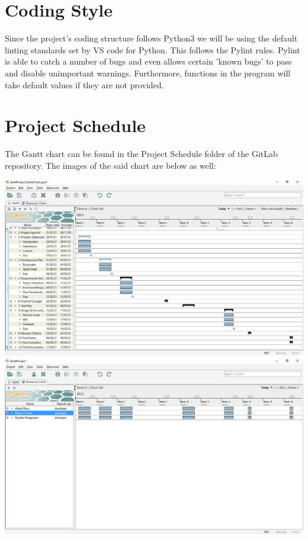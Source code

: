 \documentclass{article}
\begin{document}
\section{Coding Style}
Since the project's coding structure follows Python3 we will be using the default linting standards set by VS code for Python. This follows the Pylint rules. Pylint is able to catch a number of bugs and even allows certain 'known bugs' to pass and disable unimportant warnings. Furthermore, functions in the program will take default values if they are not provided.

\section{Project Schedule}
The Gantt chart can be found in the Project Schedule folder of the GitLab repository. The images of the said chart are below as well:
\begin{center}
    \includegraphics[scale=0.4]{Gantt1.jpg}
    \includegraphics[scale=0.4]{Gantt2.jpg}
\end{center}
\end{document}
